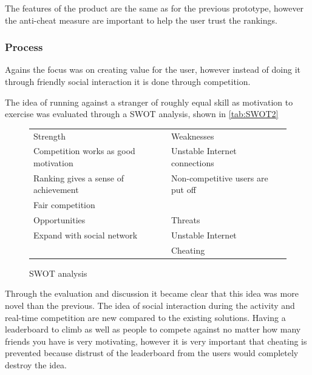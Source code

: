 The features of the product are the same as for the previous prototype, however the anti-cheat measure are important to help the user trust the rankings.

\subsubsection{Process}
Agains the focus was on creating value for the user, however instead of doing it through friendly social interaction it is done through competition. 
\vspace{10pt}

The idea of running against a stranger of roughly equal skill as motivation to exercise was evaluated through a \ac{SWOT} analysis, shown in \autoref{tab:SWOT2}

\begin{figure}[ht]
 \caption{SWOT analysis}
 \label{tab:SWOT2}
 \begin{tabular}{| l | l |}
 \hline
Strength & Weaknesses \\ 
Competition works as good motivation & Unstable Internet connections \\ 
Ranking gives a sense of achievement & Non-competitive users are put off \\
Fair competition & \\ \hline
Opportunities & Threats \\ 
Expand with social network & Unstable Internet \\
 & Cheating \\
\hline
 \end{tabular}
\end{figure}
\vspace{10pt}

Through the evaluation and discussion it became clear that this idea was more novel than the previous. The idea of social interaction during the activity and real-time competition are new compared to the existing solutions. Having a leaderboard to climb as well as people to compete against no matter how many friends you have is very motivating, however it is very important that cheating is prevented because distrust of the leaderboard from the users would completely destroy the idea.
